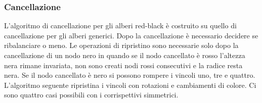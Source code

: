 \subsubsection{Cancellazione}
L'algoritmo di cancellazione per gli alberi red-black \`e costruito su quello di cancellazione per gli alberi generici. Dopo la cancellazione \`e necessario
decidere se ribalanciare o meno. Le operazioni di ripristino sono necessarie solo dopo la cancellazione di un nodo nero in quando se il nodo cancellato \`e
rosso l'altezza nera rimane invariata, non sono creati nodi rossi consecutivi e la radice resta nera. Se il nodo cancellato \`e nero si possono rompere i 
vincoli uno, tre e quattro. L'algoritmo seguente ripristina i vincoli con rotazioni e cambiamenti di colore. Ci sono quattro casi possibili con i 
corrispettivi simmetrici. 
\begin{algorithm}
\DontPrintSemicolon
{}
\caption{\protect{}}


\end{algorithm}
